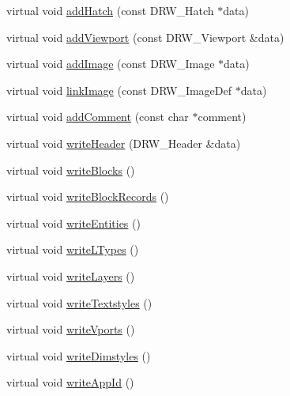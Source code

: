 \begin{DoxyCompactItemize}
\item 
virtual void \hyperlink{class_c_d_x_interface_a615dc212ba183b2153fd123e0d80e84d}{add\+Hatch} (const D\+R\+W\+\_\+\+Hatch $\ast$data)
\item 
virtual void \hyperlink{class_c_d_x_interface_abb1bc07893c04c08fb9bdfa78750ae6a}{add\+Viewport} (const D\+R\+W\+\_\+\+Viewport \&data)
\item 
virtual void \hyperlink{class_c_d_x_interface_aa78fdd694d05910cf72a9c3b94504bbe}{add\+Image} (const D\+R\+W\+\_\+\+Image $\ast$data)
\item 
virtual void \hyperlink{class_c_d_x_interface_a9943e84d52641fb52447b4a708ead49d}{link\+Image} (const D\+R\+W\+\_\+\+Image\+Def $\ast$data)
\item 
virtual void \hyperlink{class_c_d_x_interface_ab4513f861e22eebabbdf07b97f1326f8}{add\+Comment} (const char $\ast$comment)
\item 
virtual void \hyperlink{class_c_d_x_interface_ad07724224b3f9e3898a0cd0c60fa856c}{write\+Header} (D\+R\+W\+\_\+\+Header \&data)
\item 
virtual void \hyperlink{class_c_d_x_interface_a1ba4266d70776ef658e21cf89aabcae1}{write\+Blocks} ()
\item 
virtual void \hyperlink{class_c_d_x_interface_a98bc2f60f11eb79a9c3a41c16f19198a}{write\+Block\+Records} ()
\item 
virtual void \hyperlink{class_c_d_x_interface_ad57019faad37729853d2752b2d888907}{write\+Entities} ()
\item 
virtual void \hyperlink{class_c_d_x_interface_a01fae0d3a731dfd3ce6ca9edf6931e35}{write\+L\+Types} ()
\item 
virtual void \hyperlink{class_c_d_x_interface_aa42ec0e91d6557fb9ae779016badaf3e}{write\+Layers} ()
\item 
virtual void \hyperlink{class_c_d_x_interface_a177512fbcd059015700211482b0a807d}{write\+Textstyles} ()
\item 
virtual void \hyperlink{class_c_d_x_interface_a9b43624949304cf52e692a85017c2f6d}{write\+Vports} ()
\item 
virtual void \hyperlink{class_c_d_x_interface_a459c93ce2e4b8803054e33284d1e0dc0}{write\+Dimstyles} ()
\item 
virtual void \hyperlink{class_c_d_x_interface_a8674d55818b17b6dc3bbca926c399c1c}{write\+App\+Id} ()
\end{DoxyCompactItemize}
